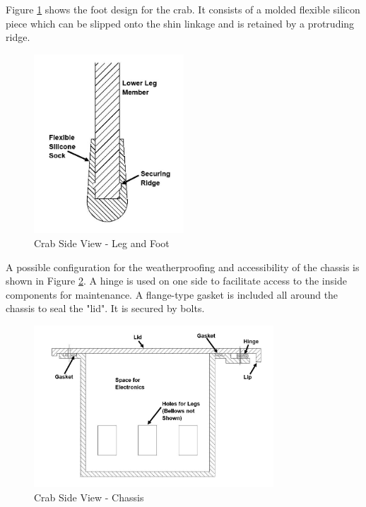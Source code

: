Figure \ref{fig:crab_foot} shows the foot design for the crab. It consists of a molded flexible silicon piece which can be slipped onto the shin linkage and is retained by a protruding ridge.

\begin{figure}[H]
    \centering
    \includegraphics[width=0.5\textwidth]{3_DesignConcepts/img/Crab/crab_foot.JPG}
    \caption{Crab Side View - Leg and Foot}
    \label{fig:crab_foot}
\end{figure}

A possible configuration for the weatherproofing and accessibility of the chassis is shown in Figure \ref{fig:crab_chassis}. A hinge is used on one side to facilitate access to the inside components for maintenance. A flange-type gasket is included all around the chassis to seal the "lid". It is secured by bolts. 

\begin{figure}[H]
    \centering
    \includegraphics[width=0.8\textwidth]{3_DesignConcepts/img/Crab/crab_chassis.JPG}
    \caption{Crab Side View - Chassis}
    \label{fig:crab_chassis}
\end{figure}



